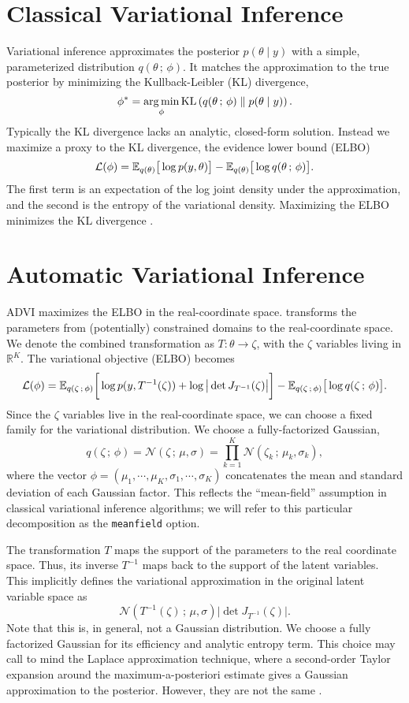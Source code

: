 \section{Classical Variational Inference}

Variational inference approximates the
posterior $p(\theta \mid y)$ with a simple, parameterized distribution
$q(\theta \,;\, \phi)$. It matches the approximation to the
true posterior by minimizing the Kullback-Leibler (KL) divergence,
%
\[
  \phi^* = \argmin_\phi
  \KL{ q(\theta \,;\, \phi) }{ p(\theta \mid y) }.
\]
%
Typically the KL divergence lacks an analytic, closed-form solution.
Instead we maximize a proxy to the KL divergence, the evidence lower bound
(ELBO)
%
\[
  \mathcal{L} (\phi)
  =
  \E_{q (\theta)} \big[ \log p (y,\theta) \big]
  -
  \E_{q (\theta)} \big[ \log q (\theta\,;\,\phi) \big].
\]
%
The first term is an expectation of the log
joint density under the approximation, and the second is the entropy of the
variational density. Maximizing the ELBO minimizes the KL
divergence \citep{Jordan:1999,Bishop:2006}.


\section{Automatic Variational Inference}

ADVI maximizes the ELBO in the real-coordinate space. \Stan transforms the
parameters from (potentially) constrained domains to
the real-coordinate space. We denote the combined transformation as
$T:\theta \to \zeta$, with the $\zeta$ variables living in $\mathbb{R}^K$.
The variational objective (ELBO) becomes
%
\[
  \mathcal{L}(\phi)
  =
  \E_{q(\zeta\,;\,\phi)}
  \bigg[
  \log p (y, T^{-1}(\zeta))
  +
  \log \big| \det J_{T^{-1}}(\zeta) \big|
  \bigg]
  -
  \E_{q (\zeta\,;\,\phi)} \big[ \log q (\zeta\,;\,\phi) \big].
\]
%
Since the $\zeta$ variables live in the real-coordinate space, we can choose a
fixed family for the variational distribution. We choose a fully-factorized
Gaussian,
%
\[
  q(\zeta \,;\, \phi)
  =
  \mathcal{N}\left(\zeta \,;\, \mu, \sigma\right)
  =
  \prod_{k=1}^K
  \mathcal{N}
  \left(\zeta_k \,;\, \mu_k, \sigma_k\right),
\]
%
where the vector
$\phi = (\mu_{1},\cdots,\mu_{K}, \sigma_ {1},\cdots,\sigma_{K})$
concatenates the mean and standard deviation of each Gaussian factor.
This reflects the ``mean-field'' assumption in classical variational
inference algorithms; we will refer to this particular decomposition
as the \texttt{meanfield} option.

The transformation $T$ maps the support of the parameters to the real
coordinate space. Thus, its inverse $T^{-1}$ maps back to the support of the
latent variables. This implicitly defines the variational approximation in the
original latent variable space as
%
\[
\mathcal{N} \left(T^{-1}(\zeta)\,;\, \mu, \sigma\right)
\big| \det J_{T^{-1}}(\zeta) \big|.
\]
Note that this is, in general, not a Gaussian distribution. We choose a
fully factorized Gaussian for its efficiency and analytic entropy term.
This choice may call to mind the Laplace approximation
technique, where a second-order Taylor expansion around the
maximum-a-posteriori estimate gives a Gaussian approximation to the
posterior. However, they are not the same \citep{Kucukelbir:2015}.

